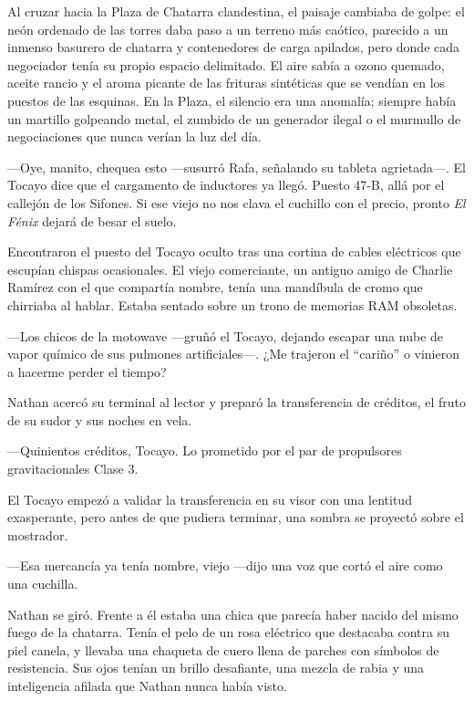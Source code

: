 \documentclass[11pt,twoside]{book}
\begin{document}
Al cruzar hacia la Plaza de Chatarra clandestina, el paisaje cambiaba de golpe: el neón ordenado de las torres daba paso a un terreno más caótico, parecido a un inmenso basurero de chatarra y contenedores de carga apilados, pero donde cada negociador tenía su propio espacio delimitado. El aire sabía a ozono quemado, aceite rancio y el aroma picante de las frituras sintéticas que se vendían en los puestos de las esquinas. En la Plaza, el silencio era una anomalía; siempre había un martillo golpeando metal, el zumbido de un generador ilegal o el murmullo de negociaciones que nunca verían la luz del día.

---Oye, manito, chequea esto ---susurró Rafa, señalando su tableta agrietada---. El Tocayo dice que el cargamento de inductores ya llegó. Puesto 47-B, allá por el callejón de los Sifones. Si ese viejo no nos clava el cuchillo con el precio, pronto \textit{El Fénix} dejará de besar el suelo.

Encontraron el puesto del Tocayo oculto tras una cortina de cables eléctricos que escupían chispas ocasionales. El viejo comerciante, un antiguo amigo de Charlie Ramírez con el que compartía nombre, tenía una mandíbula de cromo que chirriaba al hablar. Estaba sentado sobre un trono de memorias RAM obsoletas.

---Los chicos de la motowave ---gruñó el Tocayo, dejando escapar una nube de vapor químico de sus pulmones artificiales---. ¿Me trajeron el ``cariño'' o vinieron a hacerme perder el tiempo?

Nathan acercó su terminal al lector y preparó la transferencia de créditos, el fruto de su sudor y sus noches en vela.

---Quinientos créditos, Tocayo. Lo prometido por el par de propulsores gravitacionales Clase 3.

El Tocayo empezó a validar la transferencia en su visor con una lentitud exasperante, pero antes de que pudiera terminar, una sombra se proyectó sobre el mostrador.

---Esa mercancía ya tenía nombre, viejo ---dijo una voz que cortó el aire como una cuchilla.

Nathan se giró. Frente a él estaba una chica que parecía haber nacido del mismo fuego de la chatarra. Tenía el pelo de un rosa eléctrico que destacaba contra su piel canela, y llevaba una chaqueta de cuero llena de parches con símbolos de resistencia. Sus ojos tenían un brillo desafiante, una mezcla de rabia y una inteligencia afilada que Nathan nunca había visto.
\end{document}
